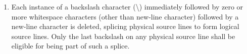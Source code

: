 \documentclass{wg21}
\begin{document}
\begin{enumerate}
\item
{}%
%
Each instance of a backslash character (\textbackslash)
immediately followed by zero or more whitespace characters (other than new-line character) followed by a new-line character is deleted, splicing
physical source lines to form logical source lines. Only the last
backslash on any physical source line shall be eligible for being part
of such a splice.

\end{enumerate}

%
%
%
%
%
%
\end{document}
